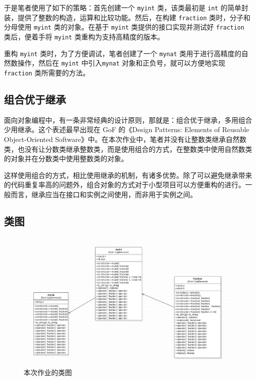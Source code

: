 \documentclass[cn,black,12pt,normal]{elegantnote}
\begin{document}
于是笔者使用了如下的策略：首先创建一个 \lstinline{myint} 类，该类最初是 \lstinline{int} 的简单封装，提供了整数的构造，运算和比较功能。然后，在构建 \lstinline{fraction} 类时，分子和分母使用 \lstinline{myint} 类的对象。在基于 \lstinline{myint} 类提供的接口实现并测试好 \lstinline{fraction} 类后，便着手将 \lstinline{myint} 类重构为支持高精度的版本。

重构 \lstinline{myint} 类时，为了方便调试，笔者创建了一个 \lstinline{mynat} 类用于进行高精度的自然数操作，然后在 \lstinline{myint} 中引入\lstinline{mynat} 对象和正负号，就可以方便地实现 \lstinline{fraction} 类所需要的方法。

\subsection{组合优于继承}

面向对象编程中，有一条非常经典的设计原则，那就是：组合优于继承，多用组合少用继承。这个表述最早出现在 GoF 的《Design Patterns: Elements of Reusable Object-Oriented Software》中。在本次作业中，笔者并没有让整数类继承自然数类，也没有让分数类继承整数类，而是使用组合的方式，在整数类中使用自然数类的对象并在分数类中使用整数类的对象。

这样使用组合的方式，相比使用继承的机制，有诸多优势。除了可以避免继承带来的代码重复率高的问题外，组合对象的方式对于小型项目可以方便重构的进行。一般而言，继承应当在接口和实例之间使用，而非用于实例之间。

\subsection{类图}

\begin{figure}[H]
    \centering
    \includegraphics[width=.8\textwidth]{imgs/class_diagram.jpg}
    \caption{本次作业的类图}
\end{figure}
\end{document}
